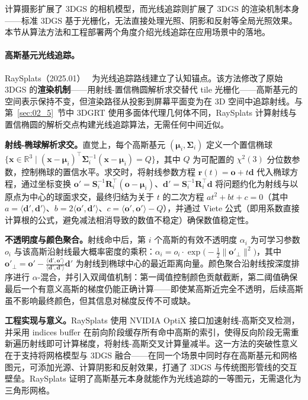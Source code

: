 计算摄影扩展了 3DGS 的相机模型，而光线追踪则扩展了 3DGS 的渲染机制本身——标准 3DGS 基于光栅化，无法直接处理光照、阴影和反射等全局光照效果。本节从算法方法和工程部署两个角度介绍光线追踪在应用场景中的落地。

\paragraph{高斯基元光线追踪。}

RaySplats（2025.01）~\cite{2501_19196} 为光线追踪路线建立了认知锚点。该方法修改了原始 3DGS 的\textbf{渲染机制}——用射线-置信椭圆解析求交替代 tile 光栅化——高斯基元的空间表示保持不变，但渲染路径从投影到屏幕平面变为在 3D 空间中追踪射线。与第~\ref{sec:02_5}~节中 3DGRT 使用多面体代理几何体不同，RaySplats 计算射线与置信椭圆的解析交点构建光线追踪算法，无需任何中间近似。

\textbf{射线-椭球解析求交。}直觉上，每个高斯基元 $(\boldsymbol{\mu}_i, \boldsymbol{\Sigma}_i)$ 定义一个置信椭球 $\{\mathbf{x} \in \mathbb{R}^3 \mid (\mathbf{x}-\boldsymbol{\mu}_i)^\top \boldsymbol{\Sigma}_i^{-1}(\mathbf{x}-\boldsymbol{\mu}_i) = Q\}$，其中 $Q$ 为可配置的 $\chi^2(3)$ 分位数参数，控制椭球的置信水平。求交时，将射线参数方程 $\mathbf{r}(t) = \mathbf{o} + t\mathbf{d}$ 代入椭球方程，通过坐标变换 $\mathbf{o}' = \mathbf{S}_i^{-1}\mathbf{R}_i^\top(\mathbf{o}-\boldsymbol{\mu}_i)$、$\mathbf{d}' = \mathbf{S}_i^{-1}\mathbf{R}_i^\top\mathbf{d}$ 将问题约化为射线与以原点为中心的球面求交，最终归结为关于 $t$ 的二次方程 $a t^2 + b t + c = 0$（其中 $a = \langle\mathbf{d}',\mathbf{d}'\rangle$、$b = 2\langle\mathbf{o}',\mathbf{d}'\rangle$、$c = \langle\mathbf{o}',\mathbf{o}'\rangle - Q$），并通过 Viete 公式（即用系数直接计算根的公式，避免减法相消导致的数值不稳定）确保数值稳定性。

\textbf{不透明度与颜色聚合。}射线命中后，第 $i$ 个高斯的有效不透明度 $\alpha_i$ 为可学习参数 $o_i$ 与该高斯沿射线最大概率密度的乘积：$\alpha_i = o_i \cdot \exp\!\bigl(-\frac{1}{2}\|\mathbf{o}'_{\perp}\|^2\bigr)$，其中 $\mathbf{o}'_{\perp} = \mathbf{o}' - \frac{\langle\mathbf{d}',\mathbf{o}'\rangle}{\langle\mathbf{d}',\mathbf{d}'\rangle}\mathbf{d}'$ 为射线到椭球中心的最近距离向量。颜色聚合沿射线按深度排序进行 $\alpha$-混合，并引入双阈值机制：第一阈值控制颜色贡献截断，第二阈值确保最后一个有意义高斯的梯度仍能正确计算——即使某高斯近完全不透明，后续高斯虽不影响最终颜色，但其信息对梯度反传不可或缺。

\textbf{工程实现与意义。}RaySplats 使用 NVIDIA OptiX 接口加速射线-高斯交叉检测，并采用 indices buffer 在前向阶段缓存所有命中高斯的索引，使得反向阶段无需重新遍历射线即可计算梯度，将射线-高斯交叉计算量减半。这一方法的突破性意义在于支持将网格模型与 3DGS 融合——在同一个场景中同时存在高斯基元和网格图元，可添加光源、计算阴影和反射效果，打通了 3DGS 与传统图形管线的交互壁垒。RaySplats 证明了高斯基元本身就能作为光线追踪的一等图元，无需退化为三角形网格。

